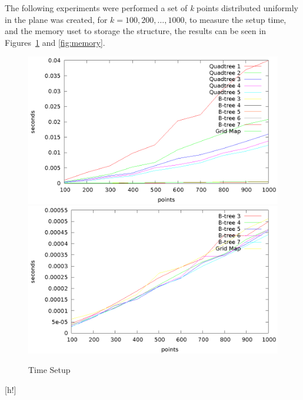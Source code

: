 \documentclass[ijoc,nonblindrev]{informs3} %
\begin{document}
The following experiments were performed
a set of \textit{k} points distributed uniformly in the plane was created,
for $k = 100,200,\ldots,1000$, to measure the setup time, and the memory uset to storage the structure, the results can be seen in Figures~\ref{fig:setup} and \ref{fig:memory}.
\begin{figure}[h!]
  \caption{Time Setup}
  \includegraphics[scale=1.25]{images/setup}
  \label{fig:setup}
  \includegraphics[scale=1.25]{images/setup_comparison}
\end{figure}[h!]
\end{document}

